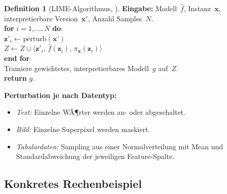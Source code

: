 ﻿\documentclass[a4paper,12pt]{article}
\theoremstyle{definition}
\newtheorem{definition}{Definition}[section]
\begin{document}
\begin{definition}[LIME-Algorithmus, \citealt{Ribeiro2016}]
  \label{def:lime_algo}
  \hfill
  \textbf{Eingabe:} Modell~$\hat{f}$, Instanz~$\mathbf{x}$, interpretierbare
  Version~$\mathbf{x}'$, Anzahl Samples~$N$.\\[4pt]
  \textbf{for} $i = 1, \ldots, N$ \textbf{do}:\\
  \quad $\mathbf{z}'_i \leftarrow \mathrm{perturb}(\mathbf{x}')$\\
  \quad $Z \leftarrow Z \cup \langle \mathbf{z}'_i,\, \hat{f}(\mathbf{z}_i),\, \pi_\mathbf{x}(\mathbf{z}_i)\rangle$\\
  \textbf{end for}\\[4pt]
  Trainiere gewichtetes, interpretierbares Modell~$g$ auf~$Z$.\\
  \textbf{return} $g$.
\end{definition}

\textbf{Perturbation je nach Datentyp:}
\begin{itemize}
  \item \emph{Text:} Einzelne WÃ¶rter werden an- oder abgeschaltet.
  \item \emph{Bild:} Einzelne Superpixel werden maskiert.
  \item \emph{Tabulardaten:} Sampling aus einer Normalverteilung mit
        Mean und Standardabweichung der jeweiligen Feature-Spalte.
\end{itemize}

\subsection{Konkretes Rechenbeispiel}
\end{document}
